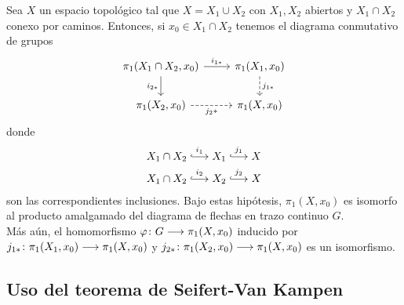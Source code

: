 \documentclass[GTSResumen.tex]{subfiles}
\begin{document}

\begin{teorema}\label{SVK} Sea $X$ un espacio topológico tal que $X=X_1\cup X_2$ con $X_1, X_2$ abiertos y $X_1\cap X_2$ conexo por caminos. Entonces, si $x_0\in X_1\cap X_2$ tenemos el diagrama conmutativo de grupos
\[
\begin{tikzcd}
\pi_1(X_1\cap X_2,x_0) \ar[r, "i_{1*}"]\arrow[d,"i_{2*} "'] & \pi_1(X_1,x_0)\ar[d,dashed,"j_{1*}"]\\
\pi_1(X_2,x_0)\ar[r,dashed,"{j_2}*"'] & \pi_1(X,x_0)
\end{tikzcd}
\]
donde
\begin{gather*}
X_1\cap X_2\overset{i_1}{\longhookarrow} X_1\overset{j_1}{\longhookarrow} X\\
X_1\cap X_2\overset{i_2}{\longhookarrow} X_2\overset{j_2}{\longhookarrow} X
\end{gather*}
son las correspondientes inclusiones. Bajo estas hipótesis, $\pi_1(X,x_0)$ es isomorfo al producto amalgamado del diagrama de flechas en trazo continuo  $G$.\\
Más aún, el homomorfismo $\varphi\colon{G}\longrightarrow{\pi_1(X,x_0)}$ inducido por $j_{1*}\colon{\pi_1(X_1,x_0)}\longrightarrow{\pi_1(X,x_0)}$ y $j_{2*}\colon{\pi_1(X_2,x_0)}\longrightarrow{\pi_1(X,x_0)}$ es un isomorfismo.
\end{teorema}
\begin{comment}
{\bf Idea del teorema:}
Sea $\alpha\func{I}{X}$ un lazo en $x_0$ que es la yuxtaposición de un camino $\alpha_{\big|[0,t_1]}$ en $X_1$ y otro $\alpha_{\big|[t_1,1]}$ en $X_2$. Consideramos $\gamma$ un camino en $X_1\cap X_2$ entre $x_0=\alpha(0)=\alpha(1)$ y $x_1=\alpha(t_1)$. Ahora $\alpha$ puede descomponerse como yuxtaposición de dos lazos
\[
\underbrace{(\alpha_{\big|[0,t_1]}*\overline{\gamma})}_{\text{En }X_1}*\underbrace{(\gamma*\alpha_{\big|[t_1,1]})}_{\text{En }X_2}
\]
el primero en $j_{1*}(\pi_1(X_1,x_0))$ y el otro en $j_{2*}(\pi_1(X_2,x_0))$.

\begin{figure}[h!]
	\texttt{[image: text4180]}
\end{figure}\

Para una prueba completa consultar \cite{Hatcher}.

\newpage
\end{comment}
\subsection{Uso del teorema de Seifert-Van Kampen}
\end{document}
